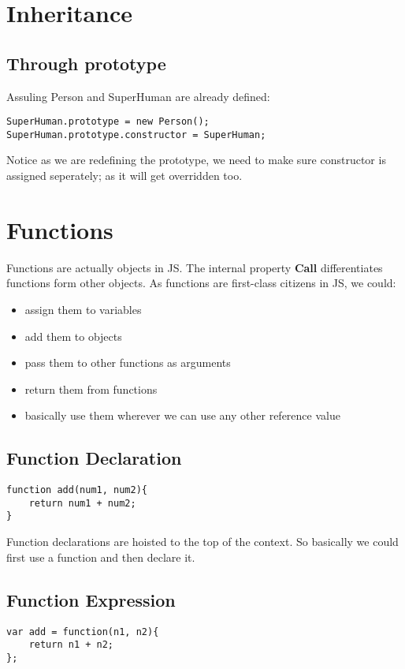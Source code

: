 \documentclass[12pt, a4paper]{article}
\begin{document}
\section{Inheritance}
\subsection{Through prototype}
Assuling Person and SuperHuman are already defined:
\begin{verbatim}
SuperHuman.prototype = new Person();
SuperHuman.prototype.constructor = SuperHuman;
\end{verbatim}
Notice as we are redefining the prototype, we need to make sure constructor is
assigned seperately; as it will get overridden too.

\section{Functions}
Functions are actually objects in JS. The internal property \textbf{Call} differentiates functions form other objects. As functions are first-class citizens in JS, we could:
\begin{itemize}
\item assign them to variables
\item add them to objects
\item pass them to other functions as arguments
\item return them from functions
\item basically use them wherever we can use any other reference value
\end{itemize}
\subsection{Function Declaration}
\begin{verbatim}
function add(num1, num2){
    return num1 + num2;
}
\end{verbatim}
Function declarations are hoisted to the top of the context. So basically we could first use a function and then declare it.
\subsection{Function Expression}
\begin{verbatim}
var add = function(n1, n2){
    return n1 + n2;
};
\end{verbatim}
\end{document}
